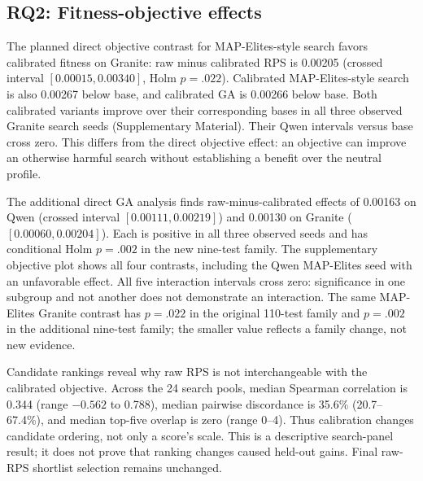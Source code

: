 \documentclass[sigconf,anonymous]{aamas}
\begin{document}
\subsection{RQ2: Fitness-objective effects}
The planned direct objective contrast for MAP-Elites-style search favors
calibrated fitness on Granite: raw minus calibrated RPS is 0.00205
(crossed interval $[0.00015,0.00340]$, Holm $p=.022$). Calibrated
MAP-Elites-style search is also 0.00267 below base, and calibrated GA is
0.00266 below base. Both calibrated variants improve over their corresponding
bases in all three observed Granite search seeds (Supplementary Material).
Their Qwen intervals versus base cross zero. This differs from the direct
objective effect: an objective can improve an otherwise harmful search without
establishing a benefit over the neutral profile.

The additional direct GA analysis finds raw-minus-calibrated effects of
0.00163 on Qwen (crossed interval $[0.00111,0.00219]$) and 0.00130 on
Granite ($[0.00060,0.00204]$). Each is positive in all three observed seeds
and has conditional Holm $p=.002$ in the new nine-test family.
The supplementary objective plot shows all four contrasts, including the
Qwen MAP-Elites seed with an unfavorable effect. All five interaction
intervals cross zero: significance in one subgroup and not another does not
demonstrate an interaction. The same MAP-Elites Granite contrast has $p=.022$
in the original 110-test family and $p=.002$ in the additional nine-test
family; the smaller value reflects a family change, not new evidence.





Candidate rankings reveal why raw RPS is not interchangeable with the
calibrated objective. Across the 24 search pools, median Spearman correlation
is 0.344 (range $-0.562$ to 0.788), median pairwise discordance is 35.6\%
(20.7--67.4\%), and median top-five overlap is zero (range 0--4). Thus
calibration changes candidate ordering, not only a score's scale. This is a
descriptive search-panel result; it does not prove that ranking changes
caused held-out gains. Final raw-RPS shortlist selection remains unchanged.
\end{document}
